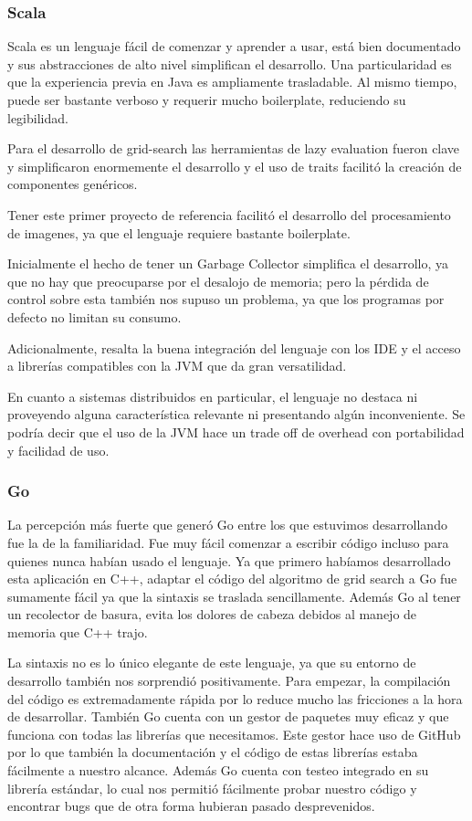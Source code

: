 \documentclass[11pt]{article}
\let\Oldsubsubsection\subsubsection
\renewcommand{\subsubsection}{\FloatBarrier\Oldsubsubsection}
\begin{document}
\subsubsection{Scala}

Scala es un lenguaje fácil de comenzar y aprender a usar, está bien documentado y sus abstracciones de alto nivel simplifican el desarrollo. Una particularidad es que la experiencia previa en Java es ampliamente trasladable. Al mismo tiempo, puede ser bastante verboso y requerir mucho boilerplate, reduciendo su legibilidad.

Para el desarrollo de grid-search las herramientas de lazy evaluation fueron clave y simplificaron enormemente el desarrollo y el uso de traits facilitó la creación de componentes genéricos.

Tener este primer proyecto de referencia facilitó el desarrollo del procesamiento de imagenes, ya que el lenguaje requiere bastante boilerplate.

Inicialmente el hecho de tener un Garbage Collector simplifica el desarrollo, ya que no hay que preocuparse por el desalojo de memoria; pero la pérdida de control sobre esta también nos supuso un problema, ya que los programas por defecto no limitan su consumo.

Adicionalmente, resalta la buena integración del lenguaje con los IDE y el acceso a librerías compatibles con la JVM que da gran versatilidad.

En cuanto a sistemas distribuidos en particular, el lenguaje no destaca ni proveyendo alguna característica relevante ni presentando algún inconveniente. Se podría decir que el uso de la JVM hace un trade off de overhead con portabilidad y facilidad de uso.

\subsubsection{Go}

La percepción más fuerte que generó Go entre los que estuvimos desarrollando fue la de la familiaridad. Fue muy fácil comenzar a escribir código incluso para quienes nunca habían usado el lenguaje. Ya que primero habíamos desarrollado esta aplicación en C++, adaptar el código del algoritmo de grid search a Go fue sumamente fácil ya que la sintaxis se traslada sencillamente. Además Go al tener un recolector de basura, evita los dolores de cabeza debidos al manejo de memoria que C++ trajo.

La sintaxis no es lo único elegante de este lenguaje, ya que su entorno de desarrollo también nos sorprendió positivamente. Para empezar, la compilación del código es extremadamente rápida por lo reduce mucho las fricciones a la hora de desarrollar. También Go cuenta con un gestor de paquetes muy eficaz y que funciona con todas las librerías que necesitamos. Este gestor hace uso de GitHub por lo que también la documentación y el código de estas librerías estaba fácilmente a nuestro alcance. Además Go cuenta con testeo integrado en su librería estándar, lo cual nos permitió fácilmente probar nuestro código y encontrar bugs que de otra forma hubieran pasado desprevenidos.
\end{document}
